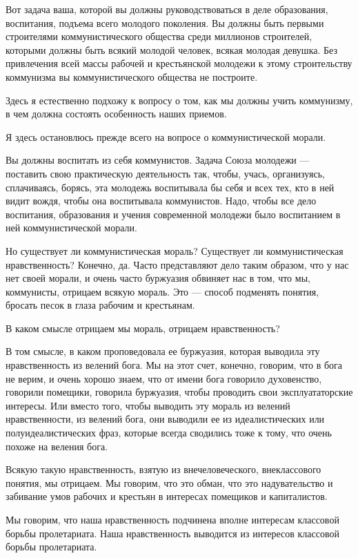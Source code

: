 \documentclass[12pt]{article}
\newcommand{\parnum}{(\arabic{parcount})}
\newcounter{parcount}
\newenvironment{parnumbers}{%
  \par%
  \everypar{\noindent \stepcounter{parcount}\marginpar[]{\parnum}}%
}{}
\begin{document}
\begin{parnumbers}
Вот задача ваша, которой вы должны руководствоваться в деле образования, воспитания, подъема всего молодого поколения. Вы должны быть первыми строителями коммунистического общества среди миллионов строителей, которыми должны быть всякий молодой человек, всякая молодая девушка. Без привлечения всей массы рабочей и крестьянской молодежи к этому строительству коммунизма вы коммунистического общества не построите.

Здесь я естественно подхожу к вопросу о том, как мы должны учить коммунизму, в чем должна состоять особенность наших приемов.

Я здесь остановлюсь прежде всего на вопросе о коммунистической морали.

Вы должны воспитать из себя коммунистов. Задача Союза молодежи — поставить свою практическую деятельность так, чтобы, учась, организуясь, сплачиваясь, борясь, эта молодежь воспитывала бы себя и всех тех, кто в ней видит вождя, чтобы она воспитывала коммунистов. Надо, чтобы все дело воспитания, образования и учения современной молодежи было воспитанием в ней коммунистической морали.

Но существует ли коммунистическая мораль? Существует ли коммунистическая нравственность? Конечно, да. Часто представляют дело таким образом, что у нас нет своей морали, и очень часто буржуазия обвиняет нас в том, что мы, коммунисты, отрицаем всякую мораль. Это — способ подменять понятия, бросать песок в глаза рабочим и крестьянам.

В каком смысле отрицаем мы мораль, отрицаем нравственность?

В том смысле, в каком проповедовала ее буржуазия, которая выводила эту нравственность из велений бога. Мы на этот счет, конечно, говорим, что в бога не верим, и очень хорошо знаем, что от имени бога говорило духовенство, говорили помещики, говорила буржуазия, чтобы проводить свои эксплуататорские интересы. Или вместо того, чтобы выводить эту мораль из велений нравственности, из велений бога, они выводили ее из идеалистических или полуидеалистических фраз, которые всегда сводились тоже к тому, что очень похоже на веления бога.

Всякую такую нравственность, взятую из внечеловеческого, внеклассового понятия, мы отрицаем. Мы говорим, что это обман, что это надувательство и забивание умов рабочих и крестьян в интересах помещиков и капиталистов.

Мы говорим, что наша нравственность подчинена вполне интересам классовой борьбы пролетариата. Наша нравственность выводится из интересов классовой борьбы пролетариата.


\end{parnumbers}
\end{document}

